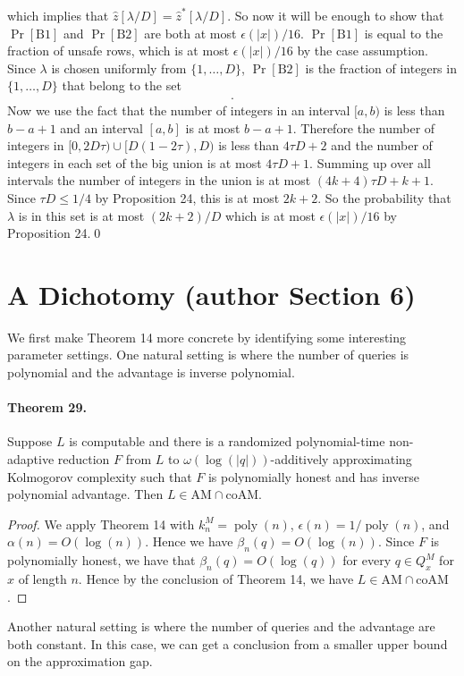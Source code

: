 \documentclass[10pt,a4paper]{article}
\begin{document}
which implies that $\hat z[\lambda/D]=\hat z^*[\lambda/D]$. So now it will be enough to show that $\Pr[\mathrm{B1}]$ and $\Pr[\mathrm{B2}]$ are both at most $\epsilon(|x|)/16$. $\Pr[\mathrm{B1}]$ is equal to the fraction of unsafe rows, which is at most $\epsilon(|x|)/16$ by the case assumption.
Since $\lambda$ is chosen uniformly from $\{1,\ldots,D\}$, $\Pr[\mathrm{B2}]$ is the fraction of integers in $\{1,\ldots,D\}$ that belong to the set
\begin{multline*}[0,2D\tau)\cup[D(1-2\tau),D)\\\cup\bigcup_{j=1}^k[D(\mu(B^*_{\hat i,j})-2\tau),D(\mu(B^*_{\hat i,j})+2\tau)].\end{multline*}
Now we use the fact that the number of integers in an interval $[a,b)$ is less than $b-a+1$ and an interval $[a,b]$ is at most $b-a+1$. Therefore the number of integers in $[0,2D\tau)\cup[D(1-2\tau),D)$ is less than $4\tau D+2$ and the number of integers in each set of the big union is at most $4\tau D+1$. Summing up over all intervals the number of integers in the union is at most $(4k+4)\tau D+k+1$. Since $\tau D\le1/4$ by Proposition 24, this is at most $2k+2$. So the probability that $\lambda$ is in this set is at most $(2k+2)/D$ which is at most $\epsilon(|x|)/16$ by Proposition 24.\qed

\section*{A Dichotomy (author Section 6)}
We first make Theorem 14 more concrete by identifying some interesting parameter settings. One natural setting is where the number of queries is polynomial and the advantage is inverse polynomial.
\paragraph{Theorem 29.} Suppose $L$ is computable and there is a randomized polynomial-time non-adaptive reduction $F$ from $L$ to $\omega(\log(|q|))$-additively approximating Kolmogorov complexity such that $F$ is polynomially honest and has inverse polynomial advantage. Then $L\in\mathrm{AM}\cap\mathrm{coAM}$.
\begin{proof}We apply Theorem 14 with $k_n^M=\operatorname{poly}(n)$, $\epsilon(n)=1/\operatorname{poly}(n)$, and $\alpha(n)=O(\log(n))$. Hence we have $\beta_n(q)=O(\log(n))$. Since $F$ is polynomially honest, we have that $\beta_n(q)=O(\log(q))$ for every $q\in Q_x^M$ for $x$ of length $n$. Hence by the conclusion of Theorem 14, we have $L\in\mathrm{AM}\cap\mathrm{coAM}$.\end{proof}
Another natural setting is where the number of queries and the advantage are both constant. In this case, we can get a conclusion from a smaller upper bound on the approximation gap.
\end{document}
